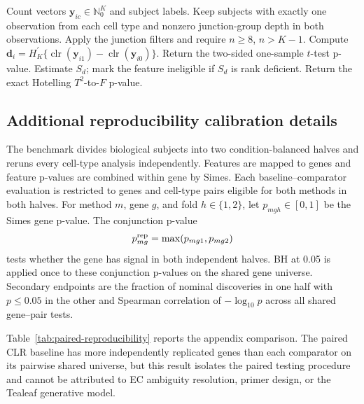 \documentclass[11pt]{article}
\begin{document}
\begin{algorithm}[H]
\caption{Paired junction log-ratio test for one cell-type pair}
\label{alg:paired-junction-logratio}
\begin{algorithmic}[1]
\Require Count vectors \(\bm y_{ic}\in\mathbb N_0^K\) and subject labels.
\State Keep subjects with exactly one observation from each cell type and nonzero junction-group depth in both observations.
\State Apply the junction filters and require \(n\geq8\), \(n>K-1\).
  \State Compute \(\bm d_i=H_K^\prime\{\operatorname{clr}(\bm y_{i1})- \operatorname{clr}(\bm y_{i0})\}\).
\EndFor
{}
  \State Return the two-sided one-sample \(t\)-test p-value.
\Else
  \State Estimate \(S_d\); mark the feature ineligible if \(S_d\) is rank deficient.
  \State Return the exact Hotelling \(T^2\)-to-\(F\) p-value.
\EndIf
\end{algorithmic}
\end{algorithm}

\subsection*{Additional reproducibility calibration details}

The benchmark divides biological subjects into two condition-balanced halves and reruns every cell-type analysis independently. Features are mapped to genes and feature p-values are combined within gene by Simes. Each baseline--comparator evaluation is restricted to genes and cell-type pairs eligible for both methods in both halves. For method \(m\), gene \(g\), and fold \(h\in\{1,2\}\), let \(p_{mgh}\in[0,1]\) be the Simes gene p-value. The conjunction p-value \[
 p_{mg}^{\rm rep}=\max(p_{mg1},p_{mg2})
\]
tests whether the gene has signal in both independent halves. BH at 0.05 is applied once to these conjunction p-values on the shared gene universe. Secondary endpoints are the fraction of nominal discoveries in one half with \(p\leq0.05\) in the other and Spearman correlation of \(-\log_{10}p\) across all shared gene--pair tests.

Table~\ref{tab:paired-reproducibility} reports the appendix comparison. The paired CLR baseline has more independently replicated genes than each comparator on its pairwise shared universe, but this result isolates the paired testing procedure and cannot be attributed to EC ambiguity resolution, primer design, or the Tealeaf generative model.
\end{document}
